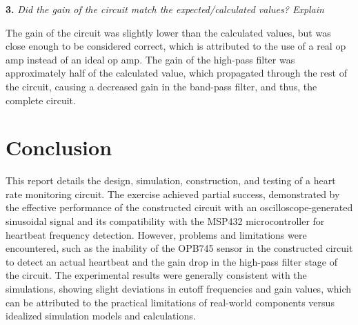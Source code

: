 \documentclass[CMPE]{KGCOEReport}
\begin{document}
\bigskip

\textbf{3.} \emph{Did the gain of the circuit match the expected/calculated values? Explain}

The gain of the circuit was slightly lower than the calculated values, but was close enough to be considered correct, which is attributed to the use of a real op amp instead of an ideal op amp. The gain of the high-pass filter was approximately half of the calculated value, which propagated through the rest of the circuit, causing a decreased gain in the band-pass filter, and thus, the complete circuit.

\section*{Conclusion}

This report details the design, simulation, construction, and testing of a heart rate monitoring circuit. The exercise achieved partial success, demonstrated by the effective performance of the constructed circuit with an oscilloscope-generated sinusoidal signal and its compatibility with the MSP432 microcontroller for heartbeat frequency detection. However, problems and limitations were encountered, such as the inability of the OPB745 sensor in the constructed circuit to detect an actual heartbeat and the gain drop in the high-pass filter stage of the circuit. The experimental results were generally consistent with the simulations, showing slight deviations in cutoff frequencies and gain values, which can be attributed to the practical limitations of real-world components versus idealized simulation models and calculations.
\end{document}
